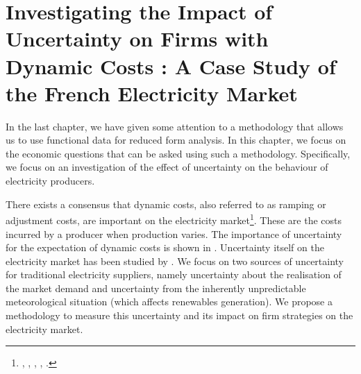 

\renewcommand{\thesection}{\arabic{chapter}.\arabic{section}}


\chapter{Investigating the Impact of Uncertainty on Firms with Dynamic Costs : A Case Study of the French Electricity Market}
\label{chap:ch2}
\cleardoublepage

In the last chapter, we have given some attention to a methodology that allows us to use functional data for reduced form analysis. In this chapter, we focus on the economic questions that can be asked using such a methodology. Specifically, we focus on an investigation of the effect of uncertainty on the behaviour of electricity producers. 

There exists a consensus that dynamic costs, also referred to as ramping or adjustment costs, are important on the electricity market\footnote{ \cite{anderson2005supply},  \cite{hobbs2001next}, \cite{hortacsu2008understanding}, \cite{reguant2011welfare}, \cite{sewalt2003negative}. }. These are the costs incurred by a producer when production varies. 
The importance of uncertainty for the expectation of dynamic costs is shown in \cite{bergesmartimort2014}. Uncertainty itself on the electricity market has been studied by \cite{wolak2007quantifying}. %
We focus on two sources of uncertainty for traditional electricity suppliers, namely uncertainty about the realisation of the market demand and uncertainty from the inherently unpredictable meteorological situation
(which affects renewables generation). 
We propose a methodology to measure this uncertainty and its impact on firm strategies on the electricity market. %

